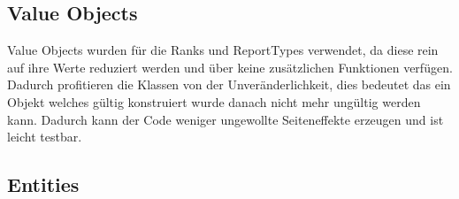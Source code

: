 \subsection{Value Objects}





Value Objects wurden für die Ranks und ReportTypes verwendet, da diese rein auf ihre Werte reduziert werden und über keine zusätzlichen Funktionen verfügen.
Dadurch profitieren die Klassen von der Unveränderlichkeit, dies bedeutet das ein Objekt welches gültig konstruiert wurde danach nicht mehr ungültig werden kann.
Dadurch kann der Code weniger ungewollte Seiteneffekte erzeugen und ist leicht testbar.


\subsection{Entities}


